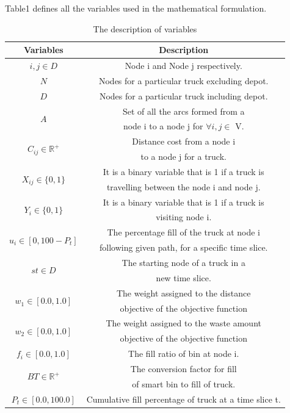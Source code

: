 \documentclass[12pt]{article}
\begin{document}
Table1 defines all the variables used in the mathematical formulation.
\begin{table}[H]\label{variables}
	\centering
	\caption{The description of variables}
	\begin{tabular*}{486pt}[H]{|c|c|}
		\hline \hspace{40pt} Variables \hspace{40pt} & \hspace{130pt} Description \hspace{130pt} \\
		\hline $i, j \in D$ & Node i and Node j respectively.\\
		\hline $N$ & Nodes for a particular truck excluding depot.\\
		\hline $D$ & Nodes for a particular truck including depot.\\
		\hline \multirow{2}{*}{$A$} & Set of all the arcs formed from a\\
		&  node i to a node j for $\forall i,j \in$ V.\\
		\hline \multirow{2}{*}{$C_{ij}\in \mathbb{R}^+$} & Distance cost from a node i\\
		& to a node j for a truck.\\
		\hline \multirow{2}{*}{$X_{ij} \in \{0, 1\}$} & It is a binary variable that is 1 if a truck is\\
		& travelling between the node i and node j.\\  
		\hline \multirow{2}{*}{$Y_{i} \in \{0, 1\}$} & It is a binary variable that is 1 if a truck is \\
		& visiting node i.\\
		\hline \multirow{2}{*}{$u_{i}  \in [0, 100 -P_{t}] $} & The percentage fill of the truck at node i \\
		& following given path, for a specific time slice.\\
		\hline \multirow{2}{*}{$st \in D$} & The starting node of a truck in a\\
		& new time slice.\\
		\hline \multirow{2}{*}{$w_{1} \in [0.0, 1.0]$} & The weight assigned to the distance \\
		& objective of the objective function\\
		\hline \multirow{2}{*}{$w_{2} \in [0.0, 1.0]$} & The weight assigned to the waste amount \\
		& objective of the objective function\\
		\hline \multirow{1}{*}{$f_{i} \in [0.0, 1.0]$} & The fill ratio of bin at node i.\\
		\hline \multirow{2}{*}{$BT \in \mathbb{R}^+$} & The conversion factor for fill \\
		& of smart bin to fill of truck.\\
		\hline \multirow{1}{*}{$P_{t} \in [0.0, 100.0]$} & Cumulative fill percentage of truck at a time slice t.\\
		\hline
	\end{tabular*}
\end{table} 
\end{document}
